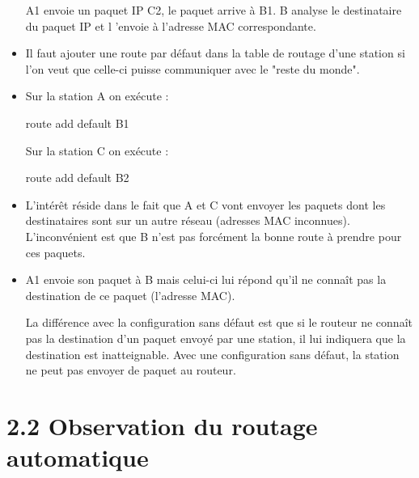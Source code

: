 \documentclass{article}
\begin{document}
\begin{itemize}
A1 envoie un paquet IP C2, le paquet arrive à B1. B analyse le destinataire du paquet IP et l 'envoie à l'adresse MAC correspondante.

\item Il faut ajouter une route par défaut dans la table de routage d'une station si l'on veut que celle-ci puisse communiquer avec le "reste du monde".

\item Sur la station A on exécute :

route add default B1

Sur la station C on exécute :

route add default B2

\item L'intérêt réside dans le fait que A et C vont envoyer les paquets dont les destinataires sont sur un autre réseau (adresses MAC inconnues).
L'inconvénient est que B n'est pas forcément la bonne route à prendre pour ces paquets.

\item A1 envoie son paquet à B mais celui-ci lui répond qu'il ne connaît pas la destination de ce paquet (l'adresse MAC).

La différence avec la configuration sans défaut est que si le routeur ne connaît pas la destination d'un paquet envoyé par une station, il lui indiquera que la destination est inatteignable. Avec une configuration sans défaut, la station ne peut pas envoyer de paquet au routeur.

\end{itemize}


\section*{2.2 Observation du routage automatique}
\end{document}
